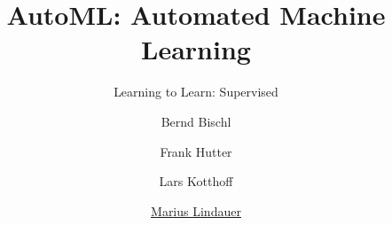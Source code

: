




\title[AutoML: Learning to Control]{AutoML: Automated Machine Learning}
\subtitle{Learning to Learn: Supervised}
\author[Marius Lindauer]{Bernd Bischl \and Frank Hutter \and Lars Kotthoff \and \underline{Marius Lindauer}}
\institute{}
\date{}





	
	\maketitle
	

